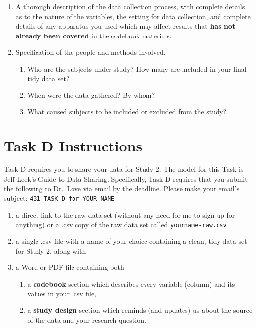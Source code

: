 \documentclass[]{book}
\providecommand{\tightlist}{%
  \setlength{\itemsep}{0pt}\setlength{\parskip}{0pt}}
\theoremstyle{definition}
\theoremstyle{definition}
\theoremstyle{definition}
\theoremstyle{remark}
\begin{document}
\begin{enumerate}
\def\labelenumi{\arabic{enumi}.}
\setcounter{enumi}{1}
\item
  A thorough description of the data collection process, with complete
  details as to the nature of the variables, the setting for data
  collection, and complete details of any apparatus you used which may
  affect results that \textbf{has not already been covered} in the
  codebook materials.
\item
  Specification of the people and methods involved.

  \begin{enumerate}
  \def\labelenumii{\alph{enumii}.}
  \tightlist
  \item
    Who are the subjects under study? How many are included in your
    final tidy data set?
  \item
    When were the data gathered? By whom?
  \item
    What caused subjects to be included or excluded from the study?
  \end{enumerate}
\end{enumerate}

\hypertarget{task-d-instructions}{%
\chapter{Task D Instructions}\label{task-d-instructions}}

Task D requires you to share your data for Study 2. The model for this
Task is Jeff Leek's \href{https://github.com/jtleek/datasharing}{Guide
to Data Sharing}. Specifically, Task D requires that you submit the
following to Dr.~Love via email by the deadline. Please make your
email's subject: \texttt{431\ TASK\ D\ for\ YOUR\ NAME}

\begin{enumerate}
\def\labelenumi{\arabic{enumi}.}
\tightlist
\item
  a direct link to the raw data set (without any need for me to sign up
  for anything) or a .csv copy of the raw data set called
  \texttt{yourname-raw.csv}
\item
  a single .csv file with a name of your choice containing a clean, tidy
  data set for Study 2, along with
\item
  a Word or PDF file containing both

  \begin{enumerate}
  \def\labelenumii{\alph{enumii}.}
  \tightlist
  \item
    a \textbf{codebook} section which describes every variable (column)
    and its values in your .csv file,
  \item
    a \textbf{study design} section which reminds (and updates) us about
    the source of the data and your research question.
  \end{enumerate}
\end{enumerate}
\end{document}

